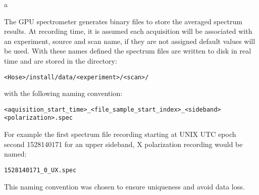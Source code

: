 a\documentclass[a4paper,14pt]{article}
\begin{document}
The GPU spectrometer generates binary files to store the averaged spectrum results. At recording time, it is assumed each acquisition will be associated with an experiment, source
and scan name, if they are not assigned default values will be used. With these names defined the spectrum files are written to disk in real time and are stored in the directory:
\begin{lstlisting}
<Hose>/install/data/<experiment>/<scan>/
\end{lstlisting}
with the following naming convention:
\begin{lstlisting}
<aquisition_start_time>_<file_sample_start_index>_<sideband><polarization>.spec
\end{lstlisting}
For example the first spectrum file recording starting at UNIX UTC epoch second 1528140171 for an upper sideband, X polarization recording would be named:  
\begin{lstlisting}
1528140171_0_UX.spec  
\end{lstlisting}
This naming convention was chosen to ensure uniqueness and avoid data loss.
\end{document}
